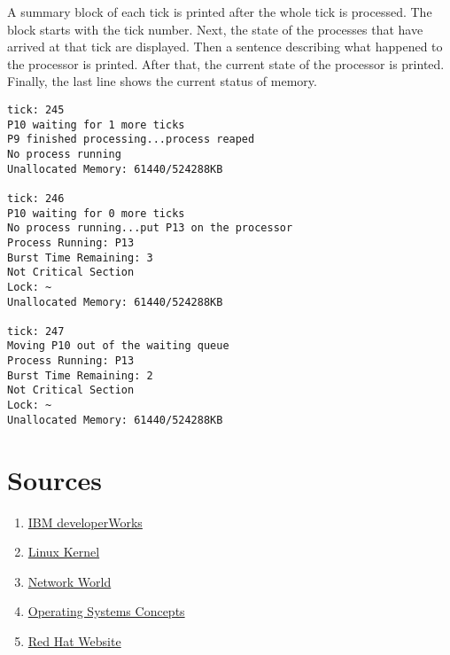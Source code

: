\documentclass[12pt]{article}
\begin{document}
A summary block of each tick is printed after the whole tick is processed. The block starts with the tick number. Next, the state of the processes that have arrived at that tick are displayed. Then a sentence describing what happened to the processor is printed. After that, the current state of the processor is printed. Finally, the last line shows the current status of memory.

\singlespacing
\begin{lstlisting}
tick: 245
P10 waiting for 1 more ticks
P9 finished processing...process reaped
No process running
Unallocated Memory: 61440/524288KB

tick: 246
P10 waiting for 0 more ticks
No process running...put P13 on the processor
Process Running: P13
Burst Time Remaining: 3
Not Critical Section
Lock: ~
Unallocated Memory: 61440/524288KB

tick: 247
Moving P10 out of the waiting queue
Process Running: P13
Burst Time Remaining: 2
Not Critical Section
Lock: ~
Unallocated Memory: 61440/524288KB
\end{lstlisting}
\doublespacing


\pagebreak
\section*{Sources}
\singlespacing
\begin{enumerate}
\item\href{https://www.ibm.com/developerworks/learn/}{IBM developerWorks}
\item\href{https://github.com/torvalds/linux}{Linux Kernel}
\item\href{https://www.networkworld.com/article/2597777/software/162275-10-things-you-need-to-know-about-Red-Hat-Enterprise-Linux-7.html}{Network World}
\item\href{https://www.amazon.com/Operating-System-Concepts-Abraham-Silberschatz/dp/1118129385}{Operating Systems Concepts}
\item\href{https://access.redhat.com/}{Red Hat Website}
\end{enumerate}
\end{document}
